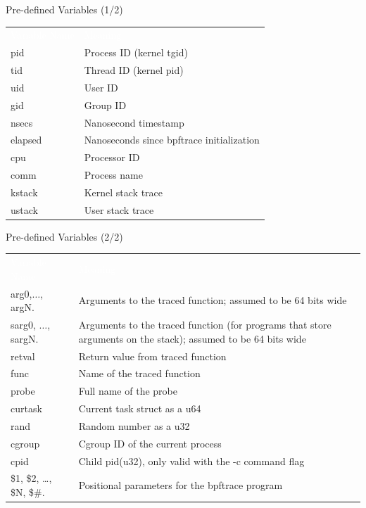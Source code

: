 \begin{reveals}
\begin{frame}[c,fragile]{Pre-defined Variables (1/2)}
      \begin{center}
        \color{deepblue}
        \begin{tabular}{|p{}p{}|}
          \arrayrulecolor{deepblue}
          {\cellcolor{deepblue}\textcolor{white}{Variable Name}} &
                                                          {\cellcolor{deepblue}\textcolor{white}{Meaning}} \\
pid & Process ID (kernel tgid)\\
tid & Thread ID (kernel pid)\\
uid & User ID\\
gid & Group ID\\
nsecs & Nanosecond timestamp\\
elapsed & Nanoseconds since bpftrace initialization\\
cpu & Processor ID\\
comm & Process name\\
kstack & Kernel stack trace\\
ustack & User stack trace\\\hline
        \end{tabular}
      \end{center}
\end{frame}
\begin{frame}[c,fragile]{Pre-defined Variables (2/2)}

      \begin{center}
        \color{deepblue}
        \begin{tabular}{|p{}p{}|}
          \arrayrulecolor{deepblue}
          {\cellcolor{deepblue}\textcolor{white}{Variable Name}} &
                                                          {\cellcolor{deepblue}\textcolor{white}{Meaning}} \\
          arg0,\(\ldots\), argN. & Arguments to the traced function; assumed to be 64 bits wide\\
sarg0, \(\ldots\), sargN. & Arguments to the traced function (for programs that store arguments on the stack); assumed to be 64 bits wide\\
retval & Return value from traced function\\
func & Name of the traced function\\
probe & Full name of the probe\\
curtask & Current task struct as a u64\\
rand & Random number as a u32\\
cgroup & Cgroup ID of the current process\\
cpid & Child pid(u32), only valid with the -c command flag\\
\$1, \$2, \ldots, \$N, \$\#. & Positional parameters for the bpftrace program\\\hline
        \end{tabular}
      \end{center}
\end{frame}


\end{reveals}
